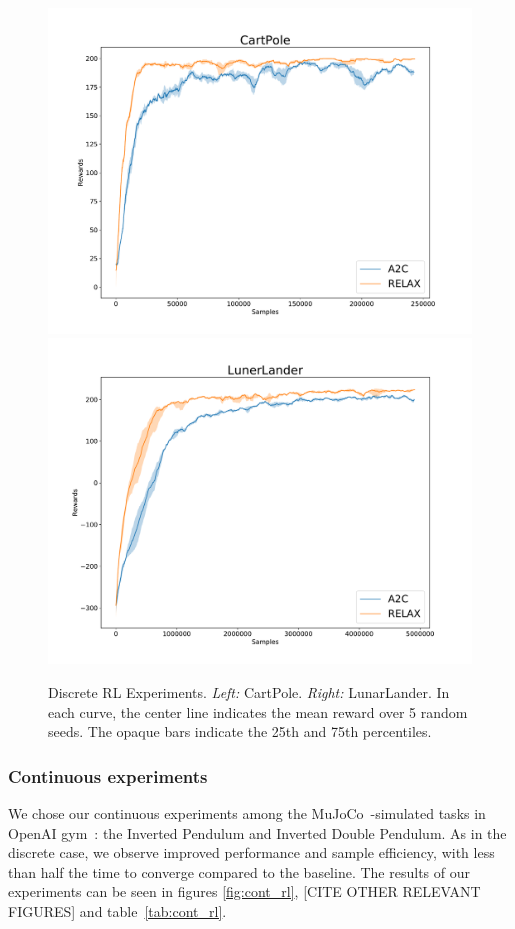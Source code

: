 \documentclass{article}
\begin{document}
\begin{figure}[h]
\centering
\includegraphics[width=.4\textwidth]{figures/cp_paper}
\includegraphics[width=.4\textwidth]{figures/ll_paper}
\caption{Discrete RL Experiments. \emph{Left:} CartPole. \emph{Right:} LunarLander. In each curve, the center line indicates the mean reward over 5 random seeds. The opaque bars indicate the 25th and 75th percentiles.}
\label{fig:disc_rl}
\end{figure}


\subsubsection{Continuous experiments}
We chose our continuous experiments among the MuJoCo~\cite{todorov2012mujoco}-simulated tasks in OpenAI gym~\cite{1606.01540}: the Inverted Pendulum and Inverted Double Pendulum. As in the discrete case, we observe improved performance and sample efficiency, with less than half the time to converge compared to the baseline. The results of our experiments can be seen in figures \ref{fig:cont_rl}, [CITE OTHER RELEVANT FIGURES] and table~\ref{tab:cont_rl}.
\end{document}
